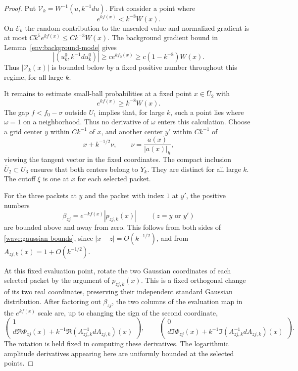 \begin{proof}
Put $\mathcal V_k=W^{-1}(u,k^{-1}du)$. First consider a point where
\begin{equation}
 e^{kf(x)}<k^{-8}W(x).
 \label{wave:low-regime}
\end{equation}
On $\mathcal E_k$ the random contribution to the unscaled value and
normalized gradient is at most $Ck^5e^{kf(x)}\le Ck^{-3}W(x)$.
The background gradient bound in Lemma~\ref{env:background-mode} gives
\[
 |(u_k^0,k^{-1}du_k^0)|\ge c e^{kf_0(x)}
                       \ge c(1-k^{-8})W(x).
\]
Thus $|\mathcal V_k(x)|$ is bounded below by a fixed positive number
throughout this regime, for all large $k$.

It remains to estimate small-ball probabilities at a fixed point
$x\in\overline U_2$ with
\begin{equation}
 e^{kf(x)}\ge k^{-8}W(x).
 \label{wave:high-regime}
\end{equation}
The gap $f<f_0-\sigma$ outside $U_1$ implies that, for large $k$,
such a point lies where $\omega=1$ on a neighborhood. Thus no derivative
of $\omega$ enters this calculation. Choose a grid center $y$ within
$Ck^{-1}$ of $x$, and another center $y'$ within $Ck^{-1}$ of
\[
 x+k^{-1/2}\nu,\qquad \nu=\frac{a(x)}{|a(x)|_h},
\]
viewing the tangent vector in the fixed coordinates. The compact
inclusion $\overline U_2\subset U_3$ ensures that both centers belong
to $Y_k$. They are distinct for all large $k$. The cutoff $\xi$ is
one at $x$ for each selected packet.

For the three packets at $y$ and the packet with index $1$ at $y'$,
the positive numbers
\[
 \beta_{zj}=e^{-kf(x)}|p_{zj,k}(x)|\qquad(z=y\text{ or }y')
\]
are bounded above and away from zero. This follows from both sides of
\eqref{wave:gaussian-bounds}, since $|x-z|=O(k^{-1/2})$, and from
$A_{zj,k}(x)=1+O(k^{-1/2})$.

At this fixed evaluation point, rotate the two Gaussian coordinates of
each selected packet by the argument of $p_{zj,k}(x)$. This is a fixed
orthogonal change of its two real coordinates, preserving their
independent standard Gaussian distribution. After factoring out
$\beta_{zj}$, the two columns of the evaluation map in the $e^{kf(x)}$
scale are, up to changing the sign of the second coordinate,
\begin{equation}
 \begin{pmatrix}1\\
 d\Re\Phi_{zj}(x)+k^{-1}\Re(A_{zj,k}^{-1}dA_{zj,k})(x)
 \end{pmatrix},\qquad
 \begin{pmatrix}0\\
 d\Im\Phi_{zj}(x)+k^{-1}\Im(A_{zj,k}^{-1}dA_{zj,k})(x)
 \end{pmatrix}.
 \label{wave:real-columns}
\end{equation}
The rotation is held fixed in computing these derivatives. The
logarithmic amplitude derivatives appearing here are uniformly bounded
at the selected points.


\end{proof}

